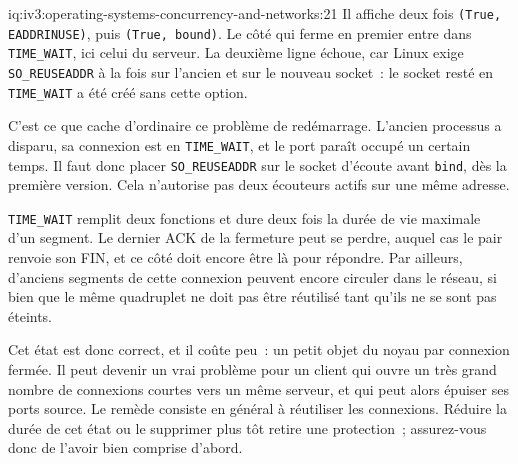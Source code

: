 \begin{solution}{iq:iv3:operating-systems-concurrency-and-networks:21}
Il affiche deux fois \texttt{(True, \textquotesingle{}EADDRINUSE\textquotesingle{})}, puis \texttt{(True, \textquotesingle{}bound\textquotesingle{})}. Le côté qui ferme en premier entre dans \texttt{TIME\_WAIT}, ici celui du serveur. La deuxième ligne échoue, car Linux exige \texttt{SO\_REUSEADDR} à la fois sur l'ancien et sur le nouveau socket~: le socket resté en \texttt{TIME\_WAIT} a été créé sans cette option.

C'est ce que cache d'ordinaire ce problème de redémarrage. L'ancien processus a disparu, sa connexion est en \texttt{TIME\_WAIT}, et le port paraît occupé un certain temps. Il faut donc placer \texttt{SO\_REUSEADDR} sur le socket d'écoute avant \texttt{bind}, dès la première version. Cela n'autorise pas deux écouteurs actifs sur une même adresse.

\texttt{TIME\_WAIT} remplit deux fonctions et dure deux fois la durée de vie maximale d'un segment. Le dernier ACK de la fermeture peut se perdre, auquel cas le pair renvoie son FIN, et ce côté doit encore être là pour répondre. Par ailleurs, d'anciens segments de cette connexion peuvent encore circuler dans le réseau, si bien que le même quadruplet ne doit pas être réutilisé tant qu'ils ne se sont pas éteints.

Cet état est donc correct, et il coûte peu~: un petit objet du noyau par connexion fermée. Il peut devenir un vrai problème pour un client qui ouvre un très grand nombre de connexions courtes vers un même serveur, et qui peut alors épuiser ses ports source. Le remède consiste en général à réutiliser les connexions. Réduire la durée de cet état ou le supprimer plus tôt retire une protection~; assurez-vous donc de l'avoir bien comprise d'abord.

\end{solution}

